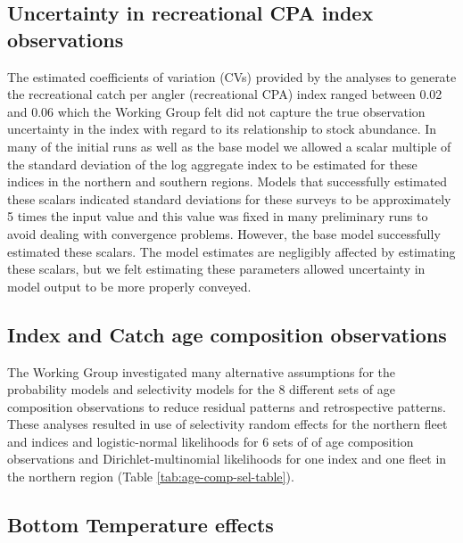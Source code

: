 \documentclass[
]{article}
\begin{document}
\hypertarget{uncertainty-in-recreational-cpa-index-observations}{%
\subsection*{Uncertainty in recreational CPA index
observations}\label{uncertainty-in-recreational-cpa-index-observations}}

The estimated coefficients of variation (CVs) provided by the analyses
to generate the recreational catch per angler (recreational CPA) index
ranged between 0.02 and 0.06 which the Working Group felt did not
capture the true observation uncertainty in the index with regard to its
relationship to stock abundance. In many of the initial runs as well as
the base model we allowed a scalar multiple of the standard deviation of
the log aggregate index to be estimated for these indices in the
northern and southern regions. Models that successfully estimated these
scalars indicated standard deviations for these surveys to be
approximately 5 times the input value and this value was fixed in many
preliminary runs to avoid dealing with convergence problems. However,
the base model successfully estimated these scalars. The model estimates
are negligibly affected by estimating these scalars, but we felt
estimating these parameters allowed uncertainty in model output to be
more properly conveyed.

\hypertarget{index-and-catch-age-composition-observations}{%
\subsection*{Index and Catch age composition
observations}\label{index-and-catch-age-composition-observations}}

The Working Group investigated many alternative assumptions for the
probability models and selectivity models for the 8 different sets of
age composition observations to reduce residual patterns and
retrospective patterns. These analyses resulted in use of selectivity
random effects for the northern fleet and indices and logistic-normal
likelihoods for 6 sets of of age composition observations and
Dirichlet-multinomial likelihoods for one index and one fleet in the
northern region (Table \ref{tab:age-comp-sel-table}).

\hypertarget{bottom-temperature-effects}{%
\subsection*{Bottom Temperature
effects}\label{bottom-temperature-effects}}
\end{document}
